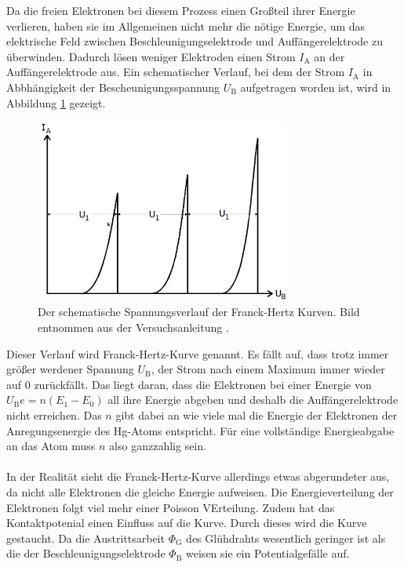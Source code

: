 Da die freien Elektronen bei diesem Prozess einen Großteil ihrer Energie verlieren, haben sie im Allgemeinen nicht mehr die nötige Energie, um das elektrische Feld zwischen Beschleunigungselektrode und Auffängerelektrode zu überwinden.
Dadurch lösen weniger Elektroden einen Strom $I_\text{A}$ an der Auffängerelektrode aus.
Ein schematischer Verlauf, bei dem der Strom $I_\text{A}$ in Abbhängigkeit der Bescheunigungsspannung $U_\text{B}$ aufgetragen worden ist, wird in Abbildung \ref{fig:spannungsverlauf} gezeigt.
\begin{figure}
    \centering
    \includegraphics[width=0.75\textwidth]{content/data/Spannungsverlauf.png}
    \caption{Der schematische Spannungsverlauf der Franck-Hertz Kurven. Bild entnommen aus der Versuchsanleitung \cite[4]{anleitung}.}
    \label{fig:spannungsverlauf}
\end{figure}
Dieser Verlauf wird Franck-Hertz-Kurve genannt.
Es fällt auf, dass trotz immer größer werdener Spannung $U_\text{B}$, der Strom nach einem Maximum immer wieder auf 0 zurückfällt.
Das liegt daran, dass die Elektronen bei einer Energie von $U_\text{B} e = n(E_1 - E_0)$ all ihre Energie abgeben und deshalb die Auffängerelektrode nicht erreichen.
Das $n$ gibt dabei an wie viele mal die Energie der Elektronen der Anregungsenergie des Hg-Atoms entspricht.
Für eine vollständige Energieabgabe an das Atom muss $n$ also ganzzahlig sein.
\\\\
In der Realität sieht die Franck-Hertz-Kurve allerdings etwas abgerundeter aus, da nicht alle Elektronen die gleiche Energie aufweisen.
Die Energieverteilung der Elektronen folgt viel mehr einer Poisson VErteilung.
Zudem hat das Kontaktpotenial einen Einfluss auf die Kurve.
Durch dieses wird die Kurve gestaucht.
Da die Austrittsarbeit $\Phi_\text{G}$ des Glühdrahts wesentlich geringer ist als die der Beschleunigungselektrode $\Phi_\text{B}$ weisen sie ein Potentialgefälle auf.
